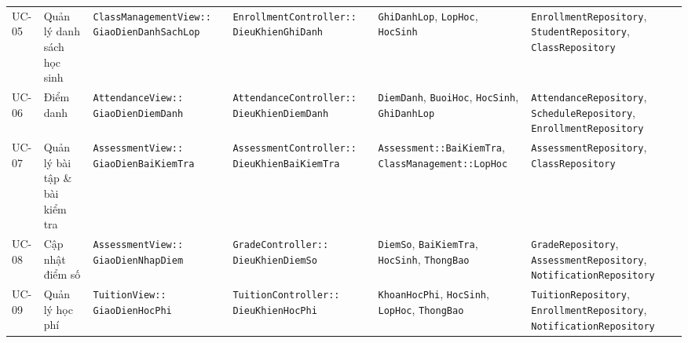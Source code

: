 \begin{landscape}
\begin{table}[p]
\begin{tabularx}{\linewidth}{@{}l >{\raggedright\arraybackslash}p{3.2cm} >{\raggedright\arraybackslash}p{4.2cm} >{\raggedright\arraybackslash}p{4.6cm} >{\raggedright\arraybackslash}p{4.8cm} >{\raggedright\arraybackslash}X@{}}
    UC-05 & Quản lý danh sách học sinh & \texttt{ClassManagementView::} \newline \texttt{GiaoDienDanhSachLop} & \texttt{EnrollmentController::} \newline \texttt{DieuKhienGhiDanh} & \texttt{GhiDanhLop}, \texttt{LopHoc}, \newline \texttt{HocSinh} & \texttt{EnrollmentRepository}, \newline \texttt{StudentRepository}, \newline \texttt{ClassRepository} \\
    UC-06 & Điểm danh & \texttt{AttendanceView::} \newline \texttt{GiaoDienDiemDanh} & \texttt{AttendanceController::} \newline \texttt{DieuKhienDiemDanh} & \texttt{DiemDanh}, \texttt{BuoiHoc}, \newline \texttt{HocSinh}, \texttt{GhiDanhLop} & \texttt{AttendanceRepository}, \newline \texttt{ScheduleRepository}, \newline \texttt{EnrollmentRepository} \\
    UC-07 & Quản lý bài tập \& bài kiểm tra & \texttt{AssessmentView::} \newline \texttt{GiaoDienBaiKiemTra} & \texttt{AssessmentController::} \newline \texttt{DieuKhienBaiKiemTra} & \texttt{Assessment::BaiKiemTra}, \newline \texttt{ClassManagement::LopHoc} & \texttt{AssessmentRepository}, \newline \texttt{ClassRepository} \\
    UC-08 & Cập nhật điểm số & \texttt{AssessmentView::} \newline \texttt{GiaoDienNhapDiem} & \texttt{GradeController::} \newline \texttt{DieuKhienDiemSo} & \texttt{DiemSo}, \texttt{BaiKiemTra}, \newline \texttt{HocSinh}, \texttt{ThongBao} & \texttt{GradeRepository}, \newline \texttt{AssessmentRepository}, \newline \texttt{NotificationRepository} \\
    UC-09 & Quản lý học phí & \texttt{TuitionView::} \newline \texttt{GiaoDienHocPhi} & \texttt{TuitionController::} \newline \texttt{DieuKhienHocPhi} & \texttt{KhoanHocPhi}, \texttt{HocSinh}, \newline \texttt{LopHoc}, \texttt{ThongBao} & \texttt{TuitionRepository}, \newline \texttt{EnrollmentRepository}, \newline \texttt{NotificationRepository} \\

\end{tabularx}
\end{table}
\end{landscape}

